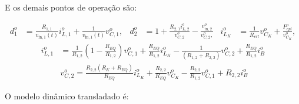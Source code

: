 \documentclass{article}
\begin{document}
E os demais pontos de operação são:

\begin{align}
  d_1^o     & = \frac{R_{1,1}}{v_{\text{in}, 1}(t)} i_{L,1}^o + \frac{1}{v_{\text{in}, 1}(t)} v_{C,1}^o, &
  d_2^o     & = 1 + \frac{R_{2,1}i_{L,2}^o}{v_{C,2}^o} - \frac{v_{\text{in},2}^o}{v_{C,2}^o,}                        &
  i_{L_K}^o & = \frac{1}{R_{crl}} v_{C_K}^o + \frac{P_{cpl}^o}{v_{C_K}^o},
\end{align}
\begin{align}
  i_{L,1}^o & = \frac{1}{R_{1,2}} \left(1 - \frac{R_{EQ}}{{R_{1,2}}}\right) v_{C,1}^o + \frac{R_{EQ}}{R_{1,2} } i_{L_K}^o - \frac{1}{ (R_{1,2} + R_{2,2})} v_{C,2}^o + \frac{R_{EQ}}{R_{1,2}} i_B^o\\[12pt]
            & v_{C,2}^o = \frac{R_{2,2}(R_K + R_{EQ})}{R_{EQ}} i_{L_K}^o + \frac{R_{2,2}}{R_{EQ}} v_{C_K}^o - \frac{R_{2,2}}{{R_{1,2}}} v_{C,1}^o + R_{2,2}i_B^o
\end{align}


O modelo dinâmico transladado é:
\end{document}
